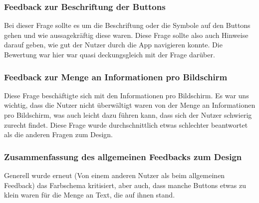         \subsubsection{Feedback zur Beschriftung der Buttons}

            Bei dieser Frage sollte es um die Beschriftung oder die Symbole auf den Buttons gehen und wie aussagekräftig diese waren. Diese Frage sollte also auch Hinweise darauf geben, wie gut der Nutzer durch die App navigieren konnte. Die Bewertung war hier war quasi deckungsgleich mit der Frage darüber.

            \begin{bchart} [min = 0, max = 10, step = 2]
                \bigskip
                \bigskip
                \bigskip
                \bigskip
            \end{bchart}

        \subsubsection{Feedback zur Menge an Informationen pro Bildschirm}

            Diese Frage beschäftigte sich mit den Informationen pro Bildschirm. Es war uns wichtig, dass die Nutzer nicht überwältigt waren von der Menge an Informationen pro Bildschirm, was auch leicht dazu führen kann, dass sich der Nutzer schwierig zurecht findet. Diese Frage wurde durchschnittlich etwas schlechter beantwortet als die anderen Fragen zum Design.

            \begin{bchart} [min = 0, max = 10, step = 2]
                \bigskip
                \bigskip
                \bigskip
                \bigskip
            \end{bchart}

        \subsubsection{Zusammenfassung des allgemeinen Feedbacks zum Design}

            Generell wurde erneut (Von einem anderen Nutzer als beim allgemeinen Feedback) das Farbschema kritisiert, aber auch, dass manche Buttons etwas zu klein waren für die Menge an Text, die auf ihnen stand.

